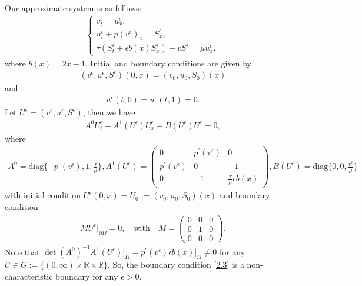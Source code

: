 \documentclass[10pt,reqno]{amsart}
\numberwithin{equation}{section}
\begin{document}
Our approximate system is as 
follows:
\begin{align}\label{2.1}
\begin{cases}
v_t^\epsilon=u_x^\epsilon,\\
u_t^\epsilon+p(v^\epsilon)_x=S_x^\epsilon,\\
\tau (S_t^\epsilon+\epsilon b(x) S_x^\epsilon)+vS^\epsilon=\mu u_x^\epsilon, 
\end{cases}
\end{align}
where $b(x)=2x-1$.
Initial and boundary conditions are given by 
\begin{align} \label{2.2}
(v^\epsilon,u^\epsilon,S^\epsilon)(0,x)=(v_0, u_0, S_0)(x)
\end{align}
and
\begin{align}\label{2.3}
u^\epsilon(t,0)=u^\epsilon(t,1)=0.
\end{align}
Let $U^\epsilon=(v^\epsilon,u^\epsilon,S^\epsilon)$, then we have
\begin{align} \label{2.4}
A^0U^\epsilon_t+A^1(U^\epsilon) U^\epsilon_x+B(U^\epsilon)U^\epsilon=0,
\end{align}
where 
\begin{align*}
A^0=\mathrm{diag}\{-p^\prime(v^\epsilon), 1, \frac{\tau}{\mu}\}, A^1(U^\epsilon)=
\begin{pmatrix}
0&p^\prime(v^\epsilon)&0\\
p^\prime(v^\epsilon)&0&-1\\
0&-1&\frac{\tau}{\mu} \epsilon b(x)
\end{pmatrix},
B(U^\epsilon)=\mathrm{diag}\{0, 0, \frac{v^\epsilon}{\mu}\}
\end{align*}
with initial condition $U^\epsilon (0,x)=U_0:=(v_0, u_0, S_0)(x)$ and boundary condition
\begin{align}\label{boundary}
MU^\epsilon|_{\partial \Omega}=0, \quad\mathrm{with}\quad
M=
\begin{pmatrix}
0&0&0\\
0&1&0\\
0&0&0
\end{pmatrix}.
\end{align}
Note that $\det{ (A^0)^{-1}A^1(U^\epsilon)}\big|_\Omega=p^\prime(v^\epsilon) \epsilon b(x)|_\Omega\neq0$ for any $U \in G:=\{ (0, \infty)\times \mathbb R \times \mathbb R\}$. 
So, the boundary condition \eqref{2.3} is a  non-characteristic boundary for any $\epsilon>0$. 
\end{document}
